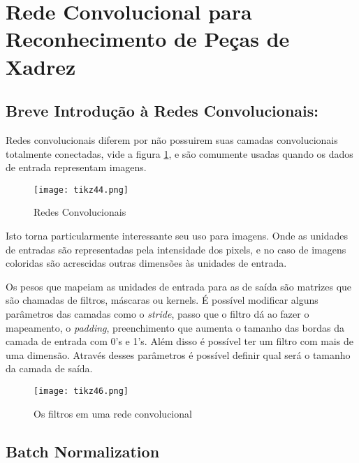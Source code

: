






\section{Rede Convolucional para Reconhecimento de Peças de
Xadrez}\label{rede-convolucional}

    \subsection{Breve Introdução à Redes
Convolucionais:}\label{breve-introducao-a-redes-convolucionais}

Redes convolucionais diferem por não possuirem suas camadas convolucionais totalmente
conectadas, vide a figura \ref{fig:conv-net}, e são comumente usadas quando os dados de entrada
representam imagens.

\begin{figure}[ht]
\centering
\texttt{[image: tikz44.png]}
\caption{Redes Convolucionais}\label{fig:conv-net}
\end{figure}

Isto torna particularmente interessante seu uso para imagens. Onde as
unidades de entradas são representadas pela intensidade dos pixels, e
no caso de imagens coloridas são acrescidas outras dimensões às
unidades de entrada.

Os pesos que mapeiam as unidades de entrada para as de saída são
matrizes que são chamadas de filtros, máscaras ou kernels. É possível
modificar alguns parâmetros das camadas como o \emph{stride}, passo que
o filtro dá ao fazer o mapeamento, o \emph{padding}, preenchimento que
aumenta o tamanho das bordas da camada de entrada com 0's e 1's. Além
disso é possível ter um filtro com mais de uma dimensão. Através desses
parâmetros é possível definir qual será o tamanho da camada de saída.

\begin{figure}[ht]
\centering
\texttt{[image: tikz46.png]}
\caption{Os filtros em uma rede convolucional}\label{fig:conv-net-filters}
\end{figure}

        \subsection{Batch Normalization}\label{batch-normalization}

